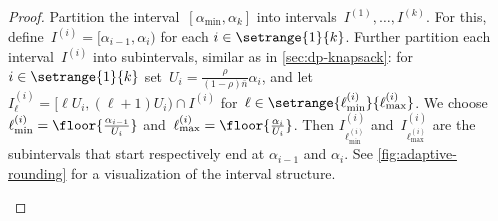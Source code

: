 \begin{proof}
  Partition the interval~$[\alpha_{\min}, \alpha_k]$ into intervals~$I^{(1)}, \dotsc, I^{(k)}$.
  For this, define~$I^{(i)} = [\alpha_{i-1}, \alpha_i)$ for each $i \in \setrange{1}{k}$.
  Further partition each interval~$I^{(i)}$
  into subintervals, similar as in \cref{sec:dp-knapsack}:
  for $i \in \setrange{1}{k}$ set~$U_i = \frac{\rho}{(1-\rho) \bar{n}} \alpha_i$,
  and let~$I^{(i)}_{\ell} = [\ell U_i, (\ell + 1) U_i) \cap I^{(i)}$
  for~$\ell \in \setrange{\ell^{(i)}_{\min}}{\ell^{(i)}_{\max}}$.
  We choose~$\ell^{(i)}_{\min} = \floor{\frac{\alpha_{i-1}}{U_i}}$
  and~$\ell^{(i)}_{\max} = \floor{\frac{\alpha_i}{U_i}}$.
  Then $I^{(i)}_{\ell^{(i)}_{\min}}$ and~$I^{(i)}_{\ell^{(i)}_{\max}}$
  are the subintervals that start respectively end at $\alpha_{i-1}$ and $\alpha_i$.
  See \cref{fig:adaptive-rounding} for a visualization of the interval structure.
  \begin{figure*}
    \centering
\end{figure*}
\end{proof}
